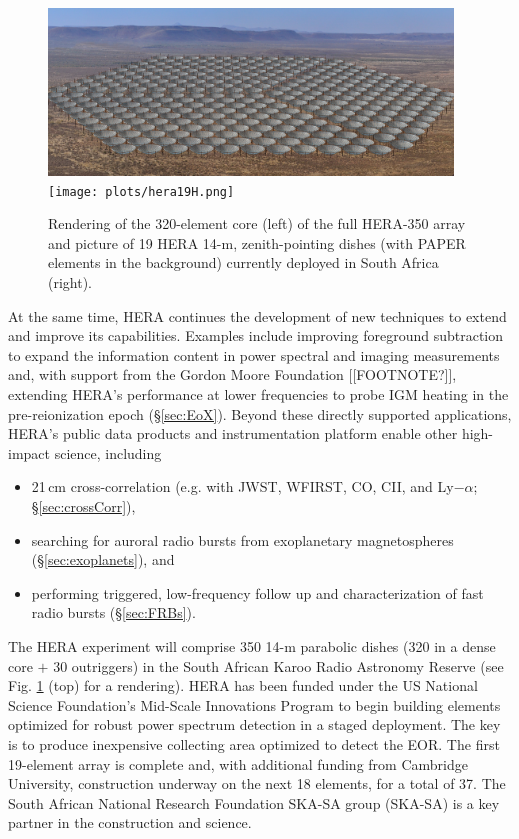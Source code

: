 \documentclass[preprint,11pt]{aastex}
\begin{document}
\begin{figure}[h!]
	\centering
	\includegraphics[height=1.75in]{plots/hera_render.png}
	\texttt{[image: plots/hera19H.png]}
	\caption{Rendering of the 320-element core (left) of the full HERA-350 array and picture of 19 HERA 14-m, zenith-pointing dishes (with PAPER elements in the background) currently deployed in South Africa (right).} 
	\label{fig:HERApictures}
\end{figure}

At the same time, HERA continues the development of new techniques to extend and improve its capabilities.
Examples include improving foreground subtraction to expand the information content 
in power spectral and imaging measurements and, with support from the Gordon Moore Foundation [[FOOTNOTE?]],
extending HERA's performance at lower frequencies to probe IGM heating in the pre-reionization epoch (\S\ref{sec:EoX}).
Beyond these directly supported applications, HERA's public data products and instrumentation platform enable other high-impact science, including 
\begin{itemize}[noitemsep,nolistsep]
\item 21\,cm cross-correlation (e.g. with JWST, WFIRST, CO, CII, and Ly$-\alpha$; \S\ref{sec:crossCorr}),
\item searching for auroral radio bursts from exoplanetary magnetospheres (\S\ref{sec:exoplanets}), and
\item performing triggered, low-frequency follow up and characterization of fast radio bursts (\S\ref{sec:FRBs}).
\end{itemize}

The HERA experiment will comprise 
350 14-m parabolic dishes (320 in a dense core $+$ 30 outriggers) in the South African Karoo Radio
Astronomy Reserve (see Fig. \ref{fig:HERApictures} (top) for a rendering).
HERA has been funded under the US National Science Foundation's Mid-Scale Innovations Program to begin building elements optimized for robust power spectrum detection in a 
staged deployment.  The key is to produce inexpensive collecting area optimized to detect the EOR.  
The first 19-element array is complete and, with additional funding from Cambridge University, construction underway on the next 18 elements, for a total of 37.
The South African National Research Foundation SKA-SA group (SKA-SA) is a key partner in the construction and science.
\end{document}
